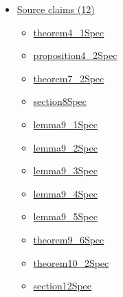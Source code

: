 \documentclass[10pt]{article}
\begin{document}
\begin{itemize}[leftmargin=1.2em]
\begin{itemize}[leftmargin=1.2em]
\item \hyperlink{paper-prerequisite-1170979838450c65}{LOS02\allowbreak{}Combinatorial\allowbreak{}Auctions.\allowbreak{}Source\allowbreak{}GVA.\allowbreak{}Truthful}
\item \hyperlink{paper-prerequisite-e43db557723739a2}{LOS02\allowbreak{}Combinatorial\allowbreak{}Auctions.\allowbreak{}Source\allowbreak{}Greedy.\allowbreak{}average\allowbreak{}Greedy\allowbreak{}Mechanism}
\item \hyperlink{paper-prerequisite-1d3828b81fa06fe7}{LOS02\allowbreak{}Combinatorial\allowbreak{}Auctions.\allowbreak{}Source\allowbreak{}Greedy.\allowbreak{}average\allowbreak{}Payment}
\end{itemize}
\item \hyperlink{source-section-f10b5f68e4acf3dc}{Source claims (12)}
\begin{itemize}[leftmargin=1.2em]
\item \hyperlink{source-claim-8602b5e535bd3ea1}{theorem4\_\allowbreak{}1\allowbreak{}Spec}
\item \hyperlink{source-claim-a7754ad8904f2e04}{proposition4\_\allowbreak{}2\allowbreak{}Spec}
\item \hyperlink{source-claim-8905add1866c3e3a}{theorem7\_\allowbreak{}2\allowbreak{}Spec}
\item \hyperlink{source-claim-b5b97d0155f8ab09}{section8\allowbreak{}Spec}
\item \hyperlink{source-claim-6ba5971f67501854}{lemma9\_\allowbreak{}1\allowbreak{}Spec}
\item \hyperlink{source-claim-c213baf0abdcb287}{lemma9\_\allowbreak{}2\allowbreak{}Spec}
\item \hyperlink{source-claim-f8f8ff7b65d62084}{lemma9\_\allowbreak{}3\allowbreak{}Spec}
\item \hyperlink{source-claim-dbe1034051a02557}{lemma9\_\allowbreak{}4\allowbreak{}Spec}
\item \hyperlink{source-claim-dc86e81c23850384}{lemma9\_\allowbreak{}5\allowbreak{}Spec}
\item \hyperlink{source-claim-f1a1d0f6c984f3dc}{theorem9\_\allowbreak{}6\allowbreak{}Spec}
\item \hyperlink{source-claim-7a1b0007541d142b}{theorem10\_\allowbreak{}2\allowbreak{}Spec}
\item \hyperlink{source-claim-121ecc0527e2699a}{section12\allowbreak{}Spec}
\end{itemize}
\end{itemize}
\end{document}
